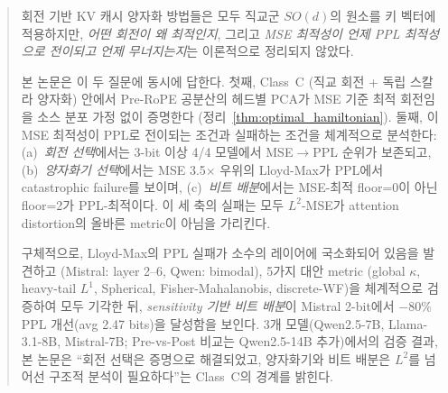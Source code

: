 \begin{abstract}
회전 기반 KV 캐시 양자화 방법들은 모두 직교군 $SO(d)$의 원소를 키 벡터에 적용하지만, \emph{어떤 회전이 왜 최적인지}, 그리고 \emph{MSE 최적성이 언제 PPL 최적성으로 전이되고 언제 무너지는지}는 이론적으로 정리되지 않았다.

본 논문은 이 두 질문에 동시에 답한다. 첫째, Class~C (직교 회전 + 독립 스칼라 양자화) 안에서 Pre-RoPE 공분산의 헤드별 PCA가 MSE 기준 최적 회전임을 소스 분포 가정 없이 증명한다 (정리~\ref{thm:optimal_hamiltonian}). 둘째, 이 MSE 최적성이 PPL로 전이되는 조건과 실패하는 조건을 체계적으로 분석한다: (a)~\emph{회전 선택}에서는 3-bit 이상 4/4 모델에서 MSE$\to$PPL 순위가 보존되고, (b)~\emph{양자화기 선택}에서는 MSE 3.5$\times$ 우위의 Lloyd-Max가 PPL에서 catastrophic failure를 보이며, (c)~\emph{비트 배분}에서는 MSE-최적 floor=0이 아닌 floor=2가 PPL-최적이다. 이 세 축의 실패는 모두 $L^2$-MSE가 attention distortion의 올바른 metric이 아님을 가리킨다.

구체적으로, Lloyd-Max의 PPL 실패가 소수의 레이어에 국소화되어 있음을 발견하고 (Mistral: layer 2--6, Qwen: bimodal), 5가지 대안 metric (global $\kappa$, heavy-tail $L^1$, Spherical, Fisher-Mahalanobis, discrete-WF)을 체계적으로 검증하여 모두 기각한 뒤, \emph{sensitivity 기반 비트 배분}이 Mistral 2-bit에서 $-80\%$ PPL 개선(avg 2.47 bits)을 달성함을 보인다. 3개 모델(Qwen2.5-7B, Llama-3.1-8B, Mistral-7B; Pre-vs-Post 비교는 Qwen2.5-14B 추가)에서의 검증 결과, 본 논문은 ``회전 선택은 증명으로 해결되었고, 양자화기와 비트 배분은 $L^2$를 넘어선 구조적 분석이 필요하다''는 Class~C의 경계를 밝힌다.
\end{abstract}
